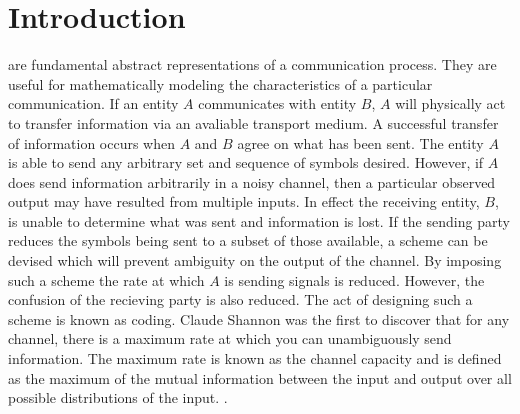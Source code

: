 \documentclass[journal]{IEEEtran}
\begin{document}
\section{Introduction}
 are fundamental abstract representations of a communication process. They are useful for mathematically modeling the characteristics of a particular communication. If an entity \begin{math}A\end{math} communicates with entity \begin{math}B\end{math}, \begin{math}A\end{math} will physically act to transfer information via an avaliable transport medium. A successful transfer of information occurs when \begin{math}A\end{math} and \begin{math}B\end{math} agree on what has been sent. The entity \begin{math}A\end{math} is able to send any arbitrary set and sequence of symbols desired. However, if \begin{math}A\end{math} does send information arbitrarily in a noisy channel, then a particular observed output may have resulted from multiple inputs. In effect the receiving entity, \begin{math}B\end{math}, is unable to determine what was sent and information is lost. If the sending party reduces the symbols being sent to a subset of those available, a scheme can be devised which will prevent ambiguity on the output of the channel. By imposing such a scheme the rate at which \begin{math}A\end{math} is sending signals is reduced. However, the confusion of the recieving party is also reduced. The act of designing such a scheme is known as coding. Claude Shannon was the first to discover that for any channel, there is a maximum rate at which you can unambiguously send information. The maximum rate is known as the channel capacity and is defined as the maximum of the mutual information between the input and output over all possible distributions of the input. \cite[p.~183-184]{cover}.
\end{document}
